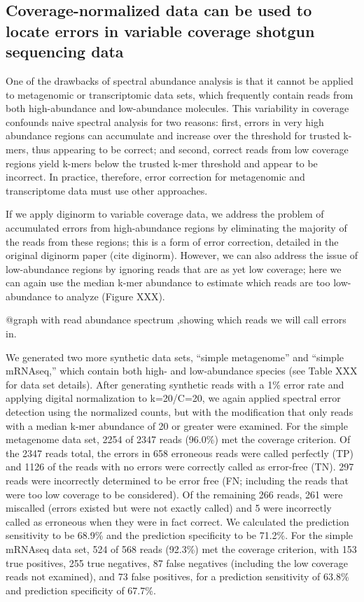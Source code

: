 \documentclass{article}
\begin{document}
\subsection{Coverage-normalized data can be used to locate errors in variable
coverage shotgun sequencing data}

One of the drawbacks of spectral abundance analysis is that it cannot
be applied to metagenomic or transcriptomic data sets, which
frequently contain reads from both high-abundance and low-abundance
molecules.  This variability in coverage confounds naive spectral
analysis for two reasons: first, errors in very high abundance regions
can accumulate and increase over the threshold for trusted k-mers,
thus appearing to be correct; and second, correct reads from low
coverage regions yield k-mers below the trusted k-mer threshold and
appear to be incorrect.  In practice, therefore, error correction for
metagenomic and transcriptome data must use other approaches.

If we apply diginorm to variable coverage data, we address the problem
of accumulated errors from high-abundance regions by eliminating the
majority of the reads from these regions; this is a form of error
correction, detailed in the original diginorm paper (cite diginorm).
However, we can also address the issue of low-abundance regions by
ignoring reads that are as yet low coverage; here we can again use
the median k-mer abundance to estimate which reads are too
low-abundance to analyze (Figure XXX).

@graph with read abundance spectrum ,showing which reads we will
call errors in.


We generated two more synthetic data sets, ``simple metagenome'' and
``simple mRNAseq,'' which contain both high- and low-abundance species
(see Table XXX for data set details).  After generating synthetic
reads with a 1\% error rate and applying digital normalization to
k=20/C=20, we again applied spectral error detection
using the normalized counts, but with the modification that only reads
with a median k-mer abundance of 20 or greater were examined.  For the
simple metagenome data set, 2254 of 2347 reads (96.0\%) met the
coverage criterion.  Of the 2347 reads total, the errors in 658
erroneous reads were called perfectly (TP) and 1126 of the reads with
no errors were correctly called as error-free (TN).  297 reads were
incorrectly determined to be error free (FN; including the reads that
were too low coverage to be considered).  Of the remaining 266 reads,
261 were miscalled (errors existed but were not exactly called) and 5
were incorrectly called as erroneous when they were in fact correct.
We calculated the prediction sensitivity to be 68.9\% and the
prediction specificity to be 71.2\%.  For the simple mRNAseq data set,
524 of 568 reads (92.3\%) met the coverage criterion, with 153 true
positives, 255 true negatives, 87 false negatives (including the low
coverage reads not examined), and 73 false positives, for a prediction
sensitivity of 63.8\% and prediction specificity of 67.7\%.
\end{document}
